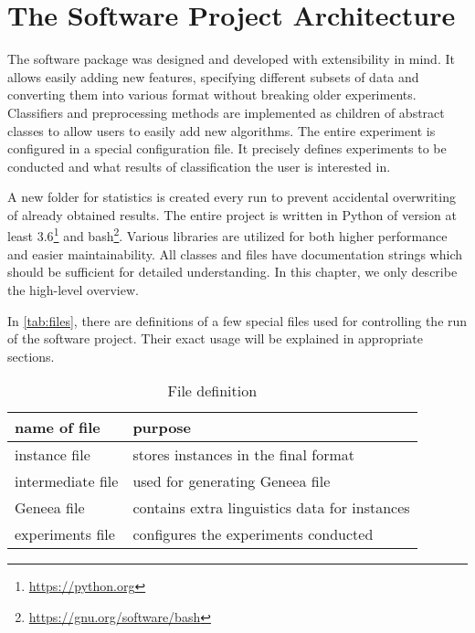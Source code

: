 \chapter{The Software Project Architecture}
\label{chap:arch}

The software package was designed and developed with extensibility in mind.
It allows easily adding new features, specifying different subsets of data and converting them into various format without breaking older experiments.
Classifiers and preprocessing methods are implemented as children of abstract classes to allow users to easily add new algorithms.
The entire experiment is configured in a special configuration file.
It precisely defines experiments to be conducted and what results of classification the user is interested in. 

A new folder for statistics is created every run to prevent accidental overwriting of already obtained results.
The entire project is written in Python of version at least 3.6\footnote{\url{https://python.org}} and bash\footnote{\url{https://gnu.org/software/bash}}.
Various libraries are utilized for both higher performance and easier maintainability.
All classes and files have documentation strings which should be sufficient for detailed understanding.
In this chapter, we only describe the high-level overview.

In \autoref{tab:files}, there are definitions of a few special files used for controlling the run of the software project.
Their exact usage will be explained in appropriate sections.

\begin{table}[h]

\centering
\begin{tabular}{ll}
\toprule
\textbf{name of file}& \textbf{purpose} \\
\midrule
instance file		 & stores instances in the final format \\
intermediate file	 & used for generating Geneea file \\
Geneea file			 & contains extra linguistics data for instances \\
experiments file	 & configures the experiments conducted \\
\bottomrule
\end{tabular}

\caption{File definition}\label{tab:files}
\end{table}



